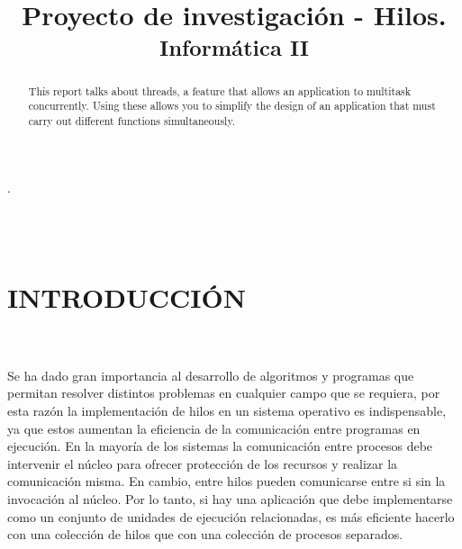 \documentclass[conference]{IEEEtran}
\begin{document}
\title{Proyecto de investigación - Hilos.
\\
{\footnotesize\textsuperscript{Informática II}
}
}



\author{




}

\maketitle

\begin{abstract}

This report talks about threads, a feature that allows an application to multitask concurrently. Using these allows you to simplify the design of an application that must carry out different functions simultaneously. \\


\end{abstract}

\begin{IEEEkeywords}

.
\end{IEEEkeywords}
\\
\\

\section{INTRODUCCIÓN}
\\
\\

Se ha dado gran importancia al desarrollo de algoritmos y programas que permitan resolver distintos problemas en cualquier campo que se requiera, por esta razón la implementación de hilos en un sistema operativo es indispensable, ya que estos aumentan la eficiencia de la comunicación entre programas en ejecución. En la mayoría de los sistemas la comunicación entre procesos debe intervenir el núcleo para ofrecer protección de los recursos y realizar la comunicación misma. En cambio, entre hilos pueden comunicarse entre si sin la invocación al núcleo. Por lo tanto, si hay una aplicación que debe implementarse como un conjunto de unidades de ejecución relacionadas, es más eficiente hacerlo con una colección de hilos que con una colección de procesos separados.
\end{document}
